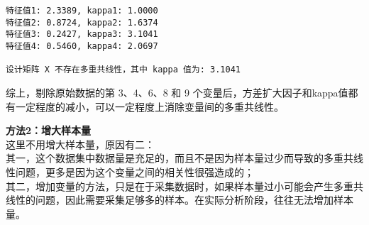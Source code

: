\documentclass[11pt]{ctexart}
\begin{document}
    \begin{Verbatim}[commandchars=\\\{\}]
特征值1: 2.3389, kappa1: 1.0000
特征值2: 0.8724, kappa2: 1.6374
特征值3: 0.2427, kappa3: 3.1041
特征值4: 0.5460, kappa4: 2.0697

设计矩阵 X 不存在多重共线性，其中 kappa 值为: 3.1041
    \end{Verbatim}

    综上，剔除原始数据的第 3、4、6、8 和 9
个变量后，方差扩大因子和kappa值都有一定程度的减小，可以一定程度上消除变量间的多重共线性。

    \textbf{方法2：增大样本量}\\
这里不用增大样本量，原因有二：\\
其一，这个数据集中数据量是充足的，而且不是因为样本量过少而导致的多重共线性问题，更多是因为这个变量之间的相关性很强造成的；\\
其二，增加变量的方法，只是在于采集数据时，如果样本量过小可能会产生多重共线性的问题，因此需要采集足够多的样本。在实际分析阶段，往往无法增加样本量。


    
    
    
\end{document}
